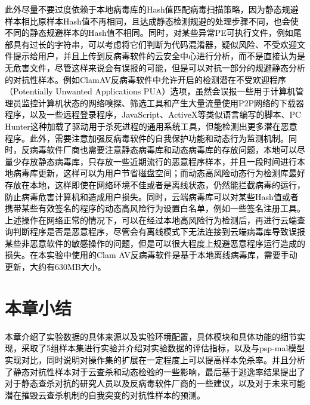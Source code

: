 \textcolor{black}{此外尽量不要过度依赖于本地病毒库的Hash值匹配病毒扫描策略，因为静态规避样本相比原样本Hash值不再相同，且达成静态检测规避的处理步骤不同，也会使不同的静态规避样本的Hash值不相同。同时，对某些异常PE可执行文件，例如尾部具有过长的字符串，可以考虑将它们判断为代码混淆器，疑似风险、不受欢迎文件提示给用户，并且上传到反病毒软件的云安全中心进行分析，而不是直接认为是无危害文件，尽管这样来说会有误报的可能，但是可以对抗一部分的规避静态分析的对抗性样本。例如ClamAV反病毒软件中允许开启的检测潜在不受欢迎程序（Potentially Unwanted Applications PUA）选项，虽然会误报一些用于计算机管理员监控计算机状态的网络嗅探、筛选工具和产生大量流量使用P2P网络的下载器程序，以及一些远程登录程序，JavaScript、ActiveX等类似语言编写的脚本、PC Hunter这种加载了驱动用于杀死进程的通用系统工具，但能检测出更多潜在恶意程序。此外，需要注意加强反病毒软件的自我保护功能和动态行为监测机制。同时，反病毒软件厂商也需要注意静态病毒库和动态病毒库的存放问题，本地可以尽量少存放静态病毒库，只存放一些近期流行的恶意程序样本，并且一段时间进行本地病毒库更新，这样可以为用户节省磁盘空间；而动态高风险动态行为检测库最好存放在本地，这样即使在网络环境不佳或者是离线状态，仍然能拦截病毒的运行，防止病毒危害计算机和造成用户损失。同时，云端病毒库可以对某些Hash值或者携带某些有效签名的程序的动态高风险行为设置白名单，例如一些签名注册工具。上述操作在网络正常的情况下，可以在经过本地高风险行为检测后，再进行云端查询判断程序是否是恶意程序，尽管会有离线模式下无法连接到云端病毒库导致误报某些非恶意软件的敏感操作的问题，但是可以很大程度上规避恶意程序运行造成的损失。在本实验中使用的Clam AV反病毒软件是基于本地离线病毒库，需要手动更新，大约有630MB大小。}

\section{本章小结}

\textcolor{black}{本章介绍了实验数据的具体来源以及实验环境配置，具体模块和具体功能的细节实现，采取了5组样本集进行实验并介绍对实验数据的评估指标，以及与psp-mal模型实现对比，同时说明对操作集的扩展在一定程度上可以提高样本免杀率。并且分析了静态对抗性样本对于云查杀和动态检验的一些影响，最后基于逃逸率结果提出了对于静态查杀对抗的研究人员以及反病毒软件厂商的一些建议，以及对于未来可能潜在摧毁云查杀机制的自我突变的对抗性样本的预测。}